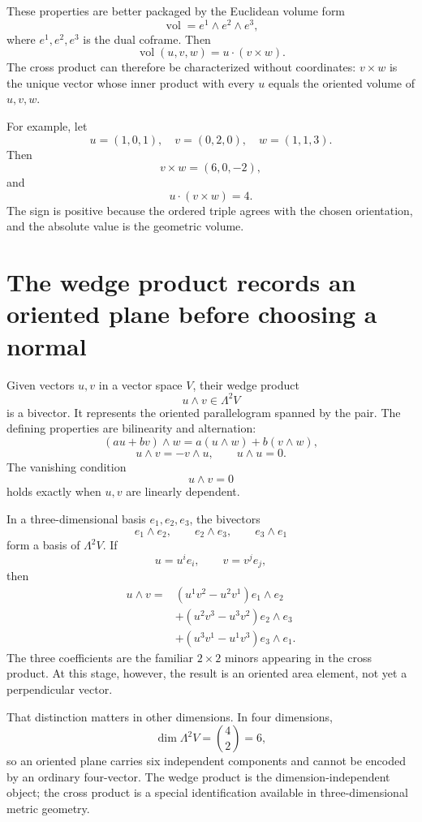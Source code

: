These properties are better packaged by the Euclidean volume form
\[
  \operatorname{vol}=e^1\wedge e^2\wedge e^3,
\]
where \(e^1,e^2,e^3\) is the dual coframe.  Then
\[
  \operatorname{vol}(u,v,w)
  =u\cdot(v\times w).
\]
The cross product can therefore be characterized without coordinates: \(v\times w\) is the unique vector whose inner product with every \(u\) equals the oriented volume of \(u,v,w\).

For example, let
\[
  u=(1,0,1),
  \quad
  v=(0,2,0),
  \quad
  w=(1,1,3).
\]
Then
\[
  v\times w=(6,0,-2),
\]
and
\[
  u\cdot(v\times w)=4.
\]
The sign is positive because the ordered triple agrees with the chosen orientation, and the absolute value is the geometric volume.

\section{The wedge product records an oriented plane before choosing a normal}

Given vectors \(u,v\) in a vector space \(V\), their wedge product
\[
  u\wedge v\in\Lambda^2V
\]
is a bivector.  It represents the oriented parallelogram spanned by the pair.  The defining properties are bilinearity and alternation:
\[
  (au+bv)\wedge w
  =a(u\wedge w)+b(v\wedge w),
\]
\[
  u\wedge v=-v\wedge u,
  \qquad
  u\wedge u=0.
\]
The vanishing condition
\[
  u\wedge v=0
\]
holds exactly when \(u,v\) are linearly dependent.

In a three-dimensional basis \(e_1,e_2,e_3\), the bivectors
\[
  e_1\wedge e_2,
  \qquad
  e_2\wedge e_3,
  \qquad
  e_3\wedge e_1
\]
form a basis of \(\Lambda^2V\).  If
\[
  u=u^ie_i,
  \qquad
  v=v^je_j,
\]
then
\[
\begin{aligned}
  u\wedge v={}&
  (u^1v^2-u^2v^1)e_1\wedge e_2\\
  &+(u^2v^3-u^3v^2)e_2\wedge e_3\\
  &+(u^3v^1-u^1v^3)e_3\wedge e_1.
\end{aligned}
\]
The three coefficients are the familiar \(2\times2\) minors appearing in the cross product.  At this stage, however, the result is an oriented area element, not yet a perpendicular vector.

That distinction matters in other dimensions.  In four dimensions,
\[
  \dim\Lambda^2V=\binom42=6,
\]
so an oriented plane carries six independent components and cannot be encoded by an ordinary four-vector.  The wedge product is the dimension-independent object; the cross product is a special identification available in three-dimensional metric geometry.

